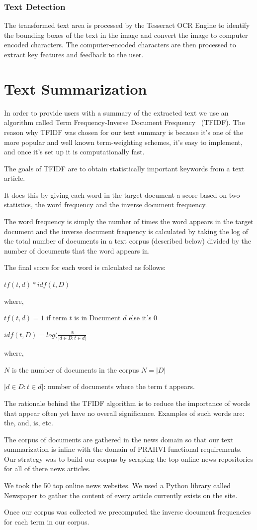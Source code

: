\subsubsection{Text Detection}
The transformed text area is processed by the Tesseract OCR Engine to identify the bounding boxes of the text in the image and convert the image to computer encoded characters. The computer-encoded characters are then processed to extract key features and feedback to the user.

\section{Text Summarization}
In order to provide users with a summary of the extracted text we use an algorithm called Term Frequency-Inverse Document Frequency \cite{tfidf} ~(TFIDF). The reason why TFIDF was chosen for our text summary is because it's one of the more popular and well known term-weighting schemes, it's easy to implement, and once it's set up it is computationally fast.

The goals of TFIDF are to obtain statistically important keywords from a text article. 

It does this by giving each word in the target document a score based on two statistics, the word frequency and the inverse document frequency.

The word frequency is simply the number of times the word appears in the target document and the inverse document frequency is calculated by taking the log of the total number of documents in a text corpus (described below) divided by the number of documents that the word appears in.

The final score for each word is calculated as follows: 

	\forceindent $tf(t, d) * idf(t, D)$  

where,

	\forceindent $tf(t, d) = 1$ if term $t$	is in Document $d$ else it's $0$

	\forceindent $idf(t, D) = log(\frac{N}{|d \in D : t \in d|}$

where,

	\forceindent $N$ is the number of documents in the corpus $N = |D|$

	\forceindent ${|d \in D : t \in d|}$: number of documents where the term $t$ appears.

The rationale behind the TFIDF algorithm is to reduce the importance of words that appear often yet have no overall significance. Examples of such words are: the, and, is, etc.


The corpus of documents are gathered in the news domain so that our text summarization is inline with the domain of PRAHVI functional requirements. Our strategy was to build our corpus by scraping the top online news repositories for all of there news articles. 

We took the 50 top online news websites. We used a Python library called Newspaper to gather the content of every article currently exists on the site.

Once our corpus was collected we precomputed the inverse document frequencies for each term in our corpus.
